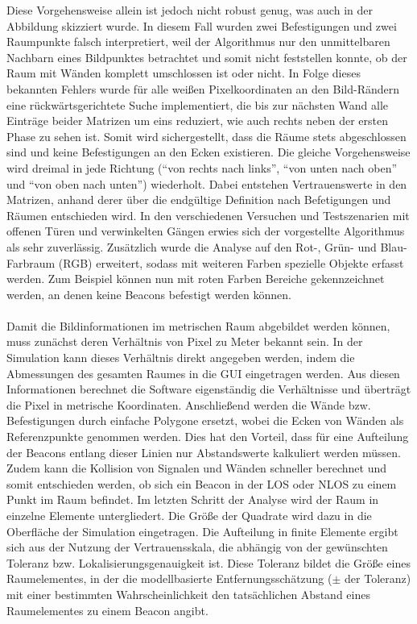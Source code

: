 Diese Vorgehensweise allein ist jedoch nicht robust genug, was auch in der Abbildung skizziert wurde. In diesem Fall wurden zwei Befestigungen und zwei Raumpunkte falsch interpretiert, weil der Algorithmus nur den unmittelbaren Nachbarn eines Bildpunktes betrachtet und somit nicht feststellen konnte, ob der Raum mit Wänden komplett umschlossen ist oder nicht. In Folge dieses bekannten Fehlers wurde für alle weißen Pixelkoordinaten an den Bild-Rändern eine rückwärtsgerichtete Suche implementiert, die bis zur nächsten Wand alle Einträge beider Matrizen um eins reduziert, wie auch rechts neben der ersten Phase zu sehen ist. Somit wird sichergestellt, dass die Räume stets abgeschlossen sind und keine Befestigungen an den Ecken existieren. Die gleiche Vorgehensweise wird dreimal in jede Richtung ("`von rechts nach links"', "`von unten nach oben"' und "`von oben nach unten"') wiederholt. Dabei entstehen Vertrauenswerte in den Matrizen, anhand derer über die endgültige Definition nach Befetigungen und Räumen entschieden wird. In den verschiedenen Versuchen und Testszenarien mit offenen Türen und verwinkelten Gängen erwies sich der vorgestellte Algorithmus als sehr zuverlässig. Zusätzlich wurde die Analyse auf den Rot-, Grün- und Blau-Farbraum (RGB) erweitert, sodass mit weiteren Farben spezielle Objekte erfasst werden. Zum Beispiel können nun mit roten Farben Bereiche gekennzeichnet werden, an denen keine Beacons befestigt werden können. \\ \\
Damit die Bildinformationen im metrischen Raum abgebildet werden können, muss zunächst deren Verhältnis von Pixel zu Meter bekannt sein. In der Simulation kann dieses Verhältnis direkt angegeben werden, indem die Abmessungen des gesamten Raumes in die GUI eingetragen werden. Aus diesen Informationen berechnet die Software eigenständig die Verhältnisse und überträgt die Pixel in metrische Koordinaten. Anschließend werden die Wände bzw. Befestigungen durch einfache Polygone ersetzt, wobei die Ecken von Wänden als Referenzpunkte genommen werden. Dies hat den Vorteil, dass für eine Aufteilung der Beacons entlang dieser Linien nur Abstandswerte kalkuliert werden müssen. Zudem kann die Kollision von Signalen und Wänden schneller berechnet und somit entschieden werden, ob sich ein Beacon in der LOS oder NLOS zu einem Punkt im Raum befindet. Im letzten Schritt der Analyse wird der Raum in einzelne Elemente untergliedert. Die Größe der Quadrate wird dazu in die Oberfläche der Simulation eingetragen. Die Aufteilung in finite Elemente ergibt sich aus der Nutzung der Vertrauensskala, die abhängig von der gewünschten Toleranz bzw. Lokalisierungsgenauigkeit ist. Diese Toleranz bildet die Größe eines Raumelementes, in der die modellbasierte Entfernungsschätzung ($\pm$ der Toleranz) mit einer bestimmten Wahrscheinlichkeit den tatsächlichen Abstand eines Raumelementes zu einem Beacon angibt. \\ \\

